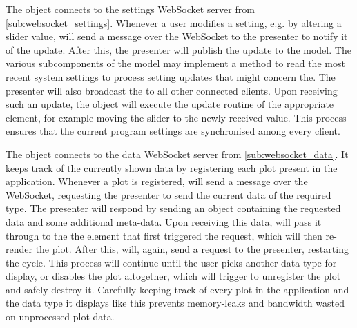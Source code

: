 \documentclass[a4paper, openany, oneside]{memoir}
\begin{document}
The  object connects to the settings WebSocket server from \cref{sub:websocket_settings}. Whenever a user modifies a setting, e.g. by altering a slider value,  will send a message over the WebSocket to the presenter to notify it of the update.
After this, the presenter will publish the update to the model. The various subcomponents of the model may implement a method to read the most recent system settings to process setting updates that might concern the.
The presenter will also broadcast the to all other connected clients. Upon receiving such an update, the  object will execute the update routine of the appropriate element, for example moving the slider to the newly received value. This process ensures that the current program settings are synchronised among every client.

The  object connects to the data WebSocket server from \cref{sub:websocket_data}. It keeps track of the currently shown data by registering each plot present in the application. Whenever a plot is registered,  will send a message over the WebSocket, requesting the presenter to send the current data of the required type. The presenter will respond by sending an object containing the requested data and some additional meta-data. Upon receiving this data,  will pass it through to the the element that first triggered the request, which will then re-render the plot. After this,  will, again, send a request to the presenter, restarting the cycle. This process will continue until the user picks another data type for display, or disables the plot altogether, which will trigger  to unregister the plot and safely destroy it. Carefully keeping track of every plot in the application and the data type it displays like this prevents memory-leaks and bandwidth wasted on unprocessed plot data.
\end{document}
